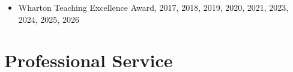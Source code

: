 \documentclass[10pt,letterpaper]{article}
\begin{document}
\begin{itemize}
  \item Wharton Teaching Excellence Award, 2017, 2018, 2019, 2020, 2021, 2023, 2024, 2025, 2026
\end{itemize}



\section*{Professional Service}
\end{document}
